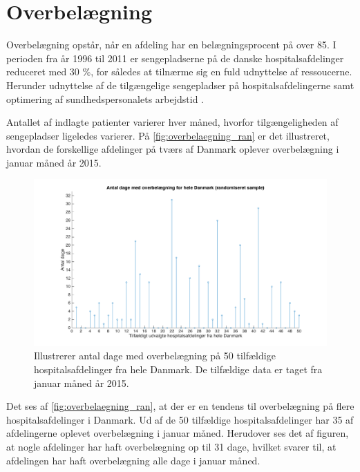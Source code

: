 \section{Overbelægning}\label{sec:overbelaegning}
Overbelægning opstår, når en afdeling har en belægningsprocent på over 85. I perioden fra år 1996 til 2011 er sengepladserne på de danske hospitalsafdelinger reduceret med 30 \%, for således at tilnærme sig en fuld udnyttelse af ressoucerne. Herunder udnyttelse af de tilgængelige sengepladser på hospitalsafdelingerne samt optimering af sundhedspersonalets arbejdstid \cite{Madsen2014}. 

Antallet af indlagte patienter varierer hver måned, hvorfor tilgængeligheden af sengepladser ligeledes varierer. På \autoref{fig:overbelaegning_ran} er det illustreret, hvordan de forskellige afdelinger  på tværs af Danmark oplever overbelægning i januar måned år 2015.

\begin{figure}[H]
\centering
\includegraphics[width=1\textwidth]{figures/overbelaegning_ran}
\caption{Illustrerer antal dage med overbelægning på 50 tilfældige hospitalsafdelinger fra hele Danmark. De tilfældige data er taget fra januar måned år 2015. \cite{SDS2015}} 
\label{fig:overbelaegning_ran}
\end{figure}

\noindent
Det ses af \autoref{fig:overbelaegning_ran}, at der er en tendens til overbelægning på flere hospitalsafdelinger i Danmark. Ud af de 50 tilfældige hospitalsafdelinger har 35 af afdelingerne oplevet overbelægning i januar måned. Herudover ses det af figuren, at nogle afdelinger har haft overbelægning op til 31 dage, hvilket svarer til, at afdelingen har haft overbelægning alle dage i januar måned.


